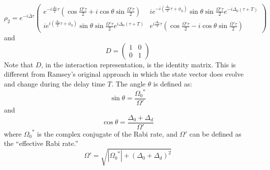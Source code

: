 \documentclass{article}
\begin{document}
\noindent 
\[
\rho_2 = e^{-i\overline\Delta\tau}
\begin{pmatrix}
e^{-i\frac{\Delta_0}{2}\tau}\left(\cos\frac{\Omega'\tau}{2} + i\cos\theta\sin\frac{\Omega'\tau}{2}\right)  
& ie^{-i\left(\frac{\Delta_0}{2}\tau + \phi_0 \right)} \sin\theta\sin\frac{\Omega'\tau}{2}e^{-i\Delta_0(\tau+T)}
\\
ie^{i\left(\frac{\Delta_0}{2}\tau + \phi_0 \right)} \sin\theta\sin\frac{\Omega'\tau}{2}e^{i\Delta_0(\tau+T)}
& 
e^{i\frac{\Delta_0}{2}\tau}\left(\cos\frac{\Omega'\tau}{2} - i\cos\theta\sin\frac{\Omega'\tau}{2}\right)  
\end{pmatrix}\]
\noindent
and 
\[D
=
\begin{pmatrix}
1 & 0 \\ 0 & 1
\end{pmatrix}
\]
\noindent
Note that $D$, in the interaction representation, is the identity matrix. This is different from Ramsey's original approach in which the state vector does evolve and change during the delay time $T$. The angle $\theta$ is defined as:
\[
\sin\theta = \frac{{\Omega_0}^*}{\Omega'}
\]
\noindent
and
\[
\cos\theta = \frac{\Delta_0 + \Delta_d}{\Omega'}
\]
\noindent
where ${\Omega_0}^*$ is the complex conjugate of the Rabi rate, and $\Omega'$ can be defined as the ``effective Rabi rate.''
\[
\Omega'= \sqrt{|{\Omega_0}^*| + (\Delta_0 + \Delta_d)^2}
\]
\newpage
\end{document}

